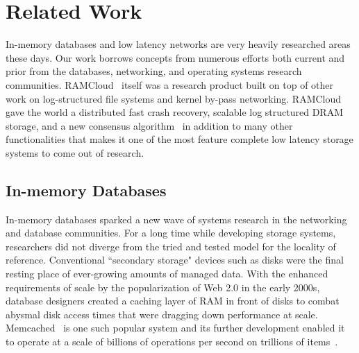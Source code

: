 
\chapter{Related Work}
\label{chap:relatedwork}

In-memory databases and low latency networks are very heavily researched areas
these days. Our work borrows concepts from numerous efforts both current and 
prior from the databases, networking, and operating systems research communities.
RAMCloud~\cite{ramcloud} itself was a research product built on top of other 
work on log-structured file systems and kernel by-pass networking. RAMCloud gave the 
world a distributed fast crash recovery, scalable log structured DRAM storage, and a new consensus 
algorithm~\cite{ryan-thesis,ongaro2011fast,ramcloudfast,raft} in addition to many other 
functionalities that makes it one of the most feature complete low latency storage systems 
to come out of research.

\section{In-memory Databases}
In-memory databases sparked a new wave of systems research in the 
networking and database communities. For a long time while developing storage
systems, researchers did not diverge from the  tried and tested model for the 
locality of reference. Conventional ``secondary storage" devices
such as disks were the final resting place of ever-growing amounts of managed data. With the 
enhanced requirements of scale by the popularization of Web 2.0 in the early 2000s, 
database designers created a caching layer of RAM in front of disks
to combat abysmal disk access times that were dragging down performance at scale. Memcached~\cite{memcached-orig}
is one such popular system and its further development
enabled it to operate at a scale of billions of operations per second on trillions of items~\cite{nishtala2013scaling}.

